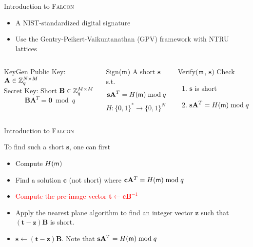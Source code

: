 \begin{frame}{Introduction to \textsc{Falcon}}

\begin{itemize}
    \item A NIST-standardized digital signature
    \item Use the Gentry-Peikert-Vaikuntanathan (GPV) framework \cite{STOC:GenPeiVai08} with NTRU lattices
\end{itemize}
\medskip
\begin{columns}[T]

\begin{block}{KeyGen}
Public Key: $\mathbf{A} \in \mathbb{Z}^{N \times M}_q$\\
Secret Key: Short $\mathbf{B} \in \mathbb{Z}_q^{M \times M}$
\vskip -10pt
\[ \mathbf{BA}^T = \mathbf{0} \bmod q \]
\end{block}

\begin{block}{Sign(${\sf m}$)}
A short $\mathbf{s}$ s.t.
\vskip -22pt
\[ \mathbf{sA}^T = H({\sf m}) \bmod q \]
\vskip -8pt
$H:\{0,1\}^* \to \{0,1\}^N$
\end{block}

\begin{block}{Verify(${\sf m}$, $\mathbf{s}$)}
Check
\begin{enumerate}
    \item $\mathbf{s}$ is short
    \item $\mathbf{sA}^T = H({\sf m}) \bmod q$
\end{enumerate}
\end{block}

\end{columns}
    
\end{frame}

\begin{frame}{Introduction to \textsc{Falcon}}

To find such a short $\mathbf{s}$, one can first
\pause
\begin{itemize}
    \item Compute $H({\sf m})$
    \pause
    \item Find a solution $\mathbf{c}$ (not short) where $\mathbf{c}\mathbf{A}^T = H({\sf m}) \bmod q$
    \pause
    \item \textcolor{red}{Compute the pre-image vector $\mathbf{t} \gets \mathbf{c}\mathbf{B}^{-1}$}
    \pause
    \item Apply the nearest plane algorithm to find an integer vector $\mathbf{z}$ such that $\mathbf{(t-z)B}$ is short.
    \pause
    \item $\mathbf{s} \gets \mathbf{(t-z)B}$. Note that $\mathbf{s}\mathbf{A}^T = H({\sf m}) \bmod q$
\end{itemize}

\end{frame}

